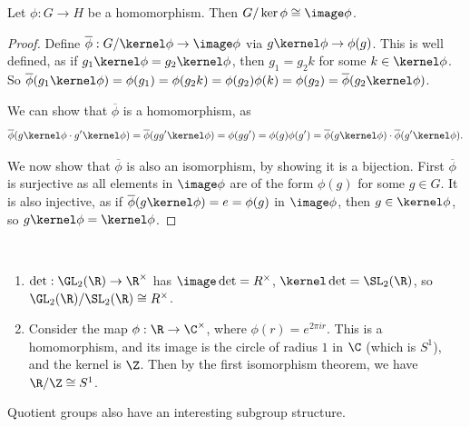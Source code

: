 \documentclass[a4paper]{scrartcl}
\begin{document}
\begin{theorem}
	Let $\phi : G \rightarrow H$ be a homomorphism. Then $G/\ker \phi \cong \image \phi$.
\end{theorem}
\begin{proof}
	Define $\overline{\phi} : G/\kernel \phi \rightarrow \image \phi$ via $g \kernel \phi \rightarrow \phi(g)$.
	This is well defined, as if $g_1 \kernel \phi = g_2 \kernel \phi$, then $g_1 = g_2k$ for some $k \in \kernel \phi$. So $\overline{\phi}(g_1 \kernel \phi) = \phi(g_1) = \phi(g_2 k) = \phi(g_2) \phi(k) = \phi(g_2) = \overline{\phi}(g_2 \kernel \phi)$.

	We can show that $\overline{\phi}$ is a homomorphism, as 
	$$
	\overline{\phi}(g \kernel \phi \cdot g' \kernel \phi) = \overline{\phi}(g g' \kernel \phi) = \phi(g g') = \phi(g) \phi(g') = \overline{\phi}(g \kernel \phi) \cdot \overline{\phi}(g' \kernel \phi).
	$$

	We now show that $\overline{\phi}$ is also an isomorphism, by showing it is a bijection. First $\overline{\phi}$ is surjective as all elements in $\image \phi$ are of the form $\phi(g)$ for some $g \in G$. It is also injective, as if $\overline{\phi}(g \kernel \phi) = e = \phi(g)$ in $\image \phi$, then $g \in \kernel \phi$, so $g \kernel \phi = \kernel \phi$.
\end{proof}

\begin{example}~
    \vspace*{-1.5\baselineskip}
\begin{enumerate}[label=(\roman*)]
    \item $\det : \GL_2(\R) \rightarrow \R^\times$ has $\image \det = R^\times$, $\kernel \det = \SL_2(\R)$, so $\GL_2(\R) / \SL_2(\R) \cong R^\times$.
    \item Consider the map $\phi : \R \rightarrow \C^\times$, where $\phi(r) = e^{2 \pi i r}$. This is a homomorphism, and its image is the circle of radius $1$ in $\C$ (which is $S^1$), and the kernel is $\Z$. Then by the first isomorphism theorem, we have $\R/\Z \cong S^1$.
\end{enumerate}
\end{example}

Quotient groups also have an interesting subgroup structure.
\end{document}
